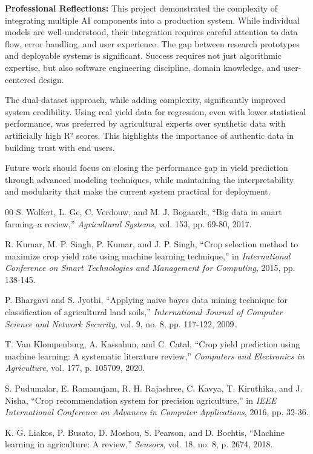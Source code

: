 \documentclass[conference]{IEEEtran}
\begin{document}
\textbf{Professional Reflections:}
This project demonstrated the complexity of integrating multiple AI components into a production system. While individual models are well-understood, their integration requires careful attention to data flow, error handling, and user experience. The gap between research prototypes and deployable systems is significant. Success requires not just algorithmic expertise, but also software engineering discipline, domain knowledge, and user-centered design.

The dual-dataset approach, while adding complexity, significantly improved system credibility. Using real yield data for regression, even with lower statistical performance, was preferred by agricultural experts over synthetic data with artificially high R² scores. This highlights the importance of authentic data in building trust with end users.

Future work should focus on closing the performance gap in yield prediction through advanced modeling techniques, while maintaining the interpretability and modularity that make the current system practical for deployment.

\begin{thebibliography}{00}
 S. Wolfert, L. Ge, C. Verdouw, and M. J. Bogaardt, ``Big data in smart farming–a review,'' \textit{Agricultural Systems}, vol. 153, pp. 69-80, 2017.

 R. Kumar, M. P. Singh, P. Kumar, and J. P. Singh, ``Crop selection method to maximize crop yield rate using machine learning technique,'' in \textit{International Conference on Smart Technologies and Management for Computing}, 2015, pp. 138-145.

 P. Bhargavi and S. Jyothi, ``Applying naive bayes data mining technique for classification of agricultural land soils,'' \textit{International Journal of Computer Science and Network Security}, vol. 9, no. 8, pp. 117-122, 2009.

 T. Van Klompenburg, A. Kassahun, and C. Catal, ``Crop yield prediction using machine learning: A systematic literature review,'' \textit{Computers and Electronics in Agriculture}, vol. 177, p. 105709, 2020.

 S. Pudumalar, E. Ramanujam, R. H. Rajashree, C. Kavya, T. Kiruthika, and J. Nisha, ``Crop recommendation system for precision agriculture,'' in \textit{IEEE International Conference on Advances in Computer Applications}, 2016, pp. 32-36.

 K. G. Liakos, P. Busato, D. Moshou, S. Pearson, and D. Bochtis, ``Machine learning in agriculture: A review,'' \textit{Sensors}, vol. 18, no. 8, p. 2674, 2018.
\end{thebibliography}
\end{document}
